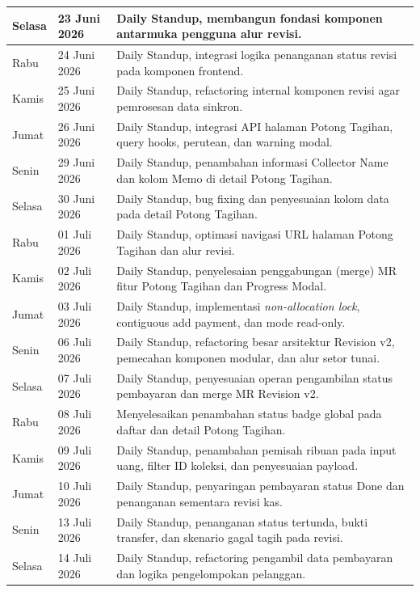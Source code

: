 \begin{center}
\begin{longtable}{|p{2.0cm}|p{2.5cm}|p{8.5cm}|}
Selasa & 23 Juni 2026 & Daily Standup, membangun fondasi komponen antarmuka pengguna alur revisi. \\ \hline
Rabu & 24 Juni 2026 & Daily Standup, integrasi logika penanganan status revisi pada komponen frontend. \\ \hline
Kamis & 25 Juni 2026 & Daily Standup, refactoring internal komponen revisi agar pemrosesan data sinkron. \\ \hline
Jumat & 26 Juni 2026 & Daily Standup, integrasi API halaman Potong Tagihan, query hooks, perutean, dan warning modal. \\ \hline
Senin & 29 Juni 2026 & Daily Standup, penambahan informasi Collector Name dan kolom Memo di detail Potong Tagihan. \\ \hline
Selasa & 30 Juni 2026 & Daily Standup, bug fixing dan penyesuaian kolom data pada detail Potong Tagihan. \\ \hline
Rabu & 01 Juli 2026 & Daily Standup, optimasi navigasi URL halaman Potong Tagihan dan alur revisi. \\ \hline
Kamis & 02 Juli 2026 & Daily Standup, penyelesaian penggabungan (merge) MR fitur Potong Tagihan dan Progress Modal. \\ \hline
Jumat & 03 Juli 2026 & Daily Standup, implementasi \textit{non-allocation lock}, contiguous add payment, dan mode read-only. \\ \hline
Senin & 06 Juli 2026 & Daily Standup, refactoring besar arsitektur Revision v2, pemecahan komponen modular, dan alur setor tunai. \\ \hline
Selasa & 07 Juli 2026 & Daily Standup, penyesuaian operan pengambilan status pembayaran dan merge MR Revision v2. \\ \hline
Rabu & 08 Juli 2026 & Menyelesaikan penambahan status badge global pada daftar dan detail Potong Tagihan. \\ \hline
Kamis & 09 Juli 2026 & Daily Standup, penambahan pemisah ribuan pada input uang, filter ID koleksi, dan penyesuaian payload. \\ \hline
Jumat & 10 Juli 2026 & Daily Standup, penyaringan pembayaran status Done dan penanganan sementara revisi kas. \\ \hline
Senin & 13 Juli 2026 & Daily Standup, penanganan status tertunda, bukti transfer, dan skenario gagal tagih pada revisi. \\ \hline
Selasa & 14 Juli 2026 & Daily Standup, refactoring pengambil data pembayaran dan logika pengelompokan pelanggan. \\ \hline

\end{longtable}
\end{center}

